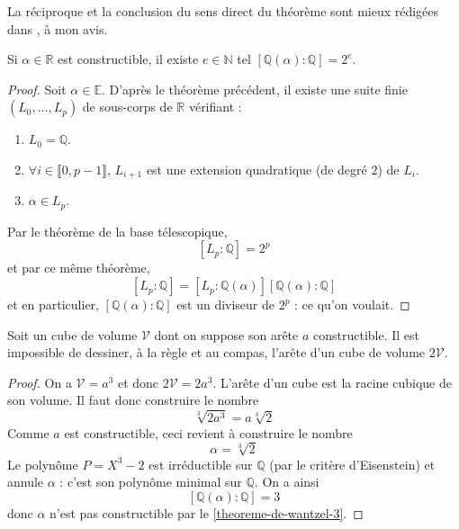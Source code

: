  La réciproque et la conclusion du sens direct du théorème sont mieux rédigées dans \cite{[GOZ]}, à mon avis.


  \begin{corollary}
    \label{theoreme-de-wantzel-3}
    Si $\alpha \in \mathbb{R}$ est constructible, il existe $e \in \mathbb{N}$ tel $[\mathbb{Q}(\alpha):\mathbb{Q}] = 2^e$.
  \end{corollary}

  \begin{proof}
    Soit $\alpha \in \mathbb{E}$. D'après le théorème précédent, il existe une suite finie $(L_0, \dots, L_p)$ de sous-corps de $\mathbb{R}$ vérifiant :
    \begin{enumerate}[label=(\roman*)]
      \item $L_0 = \mathbb{Q}$.
      \item $\forall i \in \llbracket 0, p-1 \rrbracket$, $L_{i+1}$ est une extension quadratique (de degré $2$) de $L_i$.
      \item $\alpha \in L_p$.
    \end{enumerate}
    Par le théorème de la base télescopique,
    \[ [L_p : \mathbb{Q}] = 2^p \]
    et par ce même théorème,
    \[ [L_p : \mathbb{Q}] = [L_p : \mathbb{Q}(\alpha)] [\mathbb{Q}(\alpha) : \mathbb{Q}] \]
    et en particulier, $[\mathbb{Q}(\alpha) : \mathbb{Q}]$ est un diviseur de $2^p$ : ce qu'on voulait.
  \end{proof}

  \begin{application}
    Soit un cube de volume $\mathcal{V}$ dont on suppose son arête $a$ constructible. Il est impossible de dessiner, à la règle et au compas, l'arête d'un cube de volume $2\mathcal{V}$.
  \end{application}

  \begin{proof}
    On a $\mathcal{V} = a^3$ et donc $ 2\mathcal{V} = 2a^3$. L'arête d'un cube est la racine cubique de son volume. Il faut donc construire le nombre
    \[ \sqrt[3]{2a^3} = a\sqrt[3]{2} \]
    Comme $a$ est constructible, ceci revient à construire le nombre
    \[ \alpha = \sqrt[3]{2} \]
    Le polynôme $P = X^3 - 2$ est irréductible sur $\mathbb{Q}$ (par le critère d'Eisenstein) et annule $\alpha$ : c'est son polynôme minimal sur $\mathbb{Q}$. On a ainsi
    \[ [\mathbb{Q}(\alpha) : \mathbb{Q}] = 3 \]
    donc $\alpha$ n'est pas constructible par le \cref{theoreme-de-wantzel-3}.
  \end{proof}

